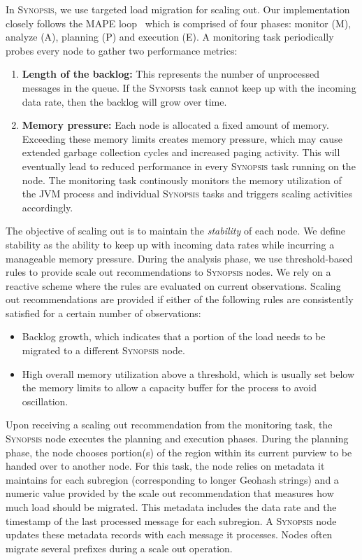 In \textsc{Synopsis}, we use targeted load migration for scaling out.
Our implementation closely follows the MAPE loop~\cite{maurer2011revealing} which is comprised of four phases: monitor (M), analyze (A), planning (P) and execution (E).
A monitoring task periodically probes every node to gather two performance metrics:
\begin{enumerate}[leftmargin=*]
	\item \textbf{Length of the backlog:} This represents the number of unprocessed messages in the queue. If the \textsc{Synopsis} task cannot keep up with the incoming data rate, then the backlog will grow over time.
	\item \textbf{Memory pressure:} Each node is allocated a fixed amount of memory. 
	Exceeding these memory limits creates memory pressure, which may cause extended garbage collection cycles and increased paging activity. 
	This will eventually lead to reduced performance in every \textsc{Synopsis} task running on the node.
	The monitoring task continously monitors the memory utilization of the JVM process and individual \textsc{Synopsis} tasks and triggers scaling activities accordingly.
\end{enumerate} 

The objective of scaling out is to maintain the \emph{stability} of each node.
We define stability as the ability to keep up with incoming data rates while incurring a manageable memory pressure.  During the analysis phase, we use threshold-based rules \cite{lorido2012auto} to provide scale out recommendations to \textsc{Synopsis} nodes.
We rely on a reactive scheme where the rules are evaluated on current observations.
Scaling out recommendations are provided if either of the following rules are consistently satisfied for a certain number of observations:
\begin{itemize}[leftmargin=*]  
\item Backlog growth, which indicates that a portion of the load needs to be migrated to a different \textsc{Synopsis} node.
\item High overall memory utilization above a threshold, which is usually set below the memory limits to allow a capacity buffer for the process to avoid oscillation.
\end{itemize}

Upon receiving a scaling out recommendation from the monitoring task, the \textsc{Synopsis} node executes the planning and execution phases.
During the planning phase, the node chooses portion(s) of the region within its current purview to be handed over to another node.
For this task, the node relies on metadata it maintains for each subregion (corresponding to longer Geohash strings) and a numeric value provided by the scale out recommendation that measures how much load should be migrated.
This metadata includes the data rate and the timestamp of the last processed message for each subregion.
A \textsc{Synopsis} node updates these metadata records with each message it processes.
Nodes often migrate several prefixes during a scale out operation.

